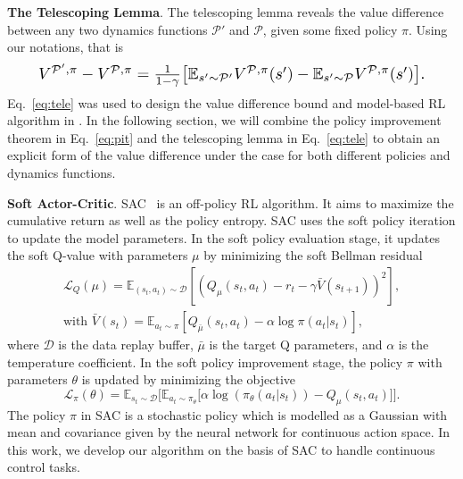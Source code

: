 \documentclass[letterpaper]{article} %
\def\E{{\mathbb{E}}}
\def\P{{\mathcal{P}}}
\begin{document}
\textbf{The Telescoping Lemma}.
The telescoping lemma \citep{luo2018algorithmic} reveals the value difference between any two dynamics functions $\P'$ and $\P$, given some fixed policy $\pi$. Using our notations, that is
\begin{equation}
\resizebox{.9\hsize}{!}{$
V^{\P',\pi}-V^{\P,\pi}=\frac{1}{1-\gamma}\big[
\E_{s'\sim\P'}V^{\P,\pi}(s')-\E_{s'\sim\P}V^{\P,\pi}(s')
\big].
$}
\label{eq:tele}
\end{equation}
Eq.~\eqref{eq:tele} was used to design the value difference bound and model-based RL algorithm in \citep{luo2018algorithmic}. In the following section, we will combine the policy improvement theorem in Eq.~\eqref{eq:pit} and the telescoping lemma in Eq.~\eqref{eq:tele} to obtain an explicit form of the value difference under the case for both different policies and dynamics functions.

\textbf{Soft Actor-Critic}.
SAC~\cite{haarnoja2018soft} is an off-policy RL algorithm.
It aims to maximize the cumulative return as well as the policy entropy.
SAC uses the soft policy iteration to update the model parameters.
In the soft policy evaluation stage, it updates the soft Q-value with parameters $\mu$ by minimizing the soft Bellman residual
\begin{equation}
\begin{aligned}
    \mathcal{L}_Q(\mu) = \E_{(s_t, a_t) \sim \mathcal{D}} \left[( Q_{\mu}(s_t, a_t) - r_t - \gamma \bar{V}(s_{t+1}))^2\right], \\
    \text{with } \bar{V}(s_t) = \E_{a_t \sim \pi} \left[Q_{\bar{\mu}}(s_t, a_t) - \alpha \log \pi(a_t|s_t)\right],
\end{aligned}
\label{eq:soft_q}
\end{equation}
where $\mathcal{D}$ is the data replay buffer, $\bar{\mu}$ is the target Q parameters, and $\alpha$ is the temperature coefficient.
In the soft policy improvement stage, the policy $\pi$ with parameters $\theta$ is updated by minimizing the objective
\begin{equation}
    \mathcal{L}_{\pi}(\theta) = \E_{s_t \sim \mathcal{D}} \bigg[
    \E_{a_t \sim \pi_{\theta}} \big[\alpha \log(\pi_{\theta}(a_t|s_t)) - Q_{\mu}(s_t, a_t)\big]
    \bigg].
\label{eq:ori_sac}
\end{equation}
The policy $\pi$ in SAC is a stochastic policy which is modelled as a Gaussian with mean and covariance given by the neural network for continuous action space.
In this work, we develop our algorithm on the basis of SAC to handle continuous control tasks.
\end{document}
